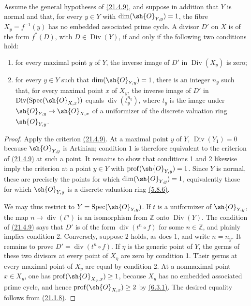 \begin{corollary}[21.4.10]
\ifdefined\EGAIVSuppressErratumLabels\else\label{IV.21.4.10}\fi
Assume the general hypotheses of {\hyperlink{ega4.c04.prop.21-4-9}{(21.4.9)}}, and suppose in addition that
$Y$ is normal and that, for every $y\in Y$ with
$\dim(\sh{O}_{Y,y})=1$, the fibre $X_y=f^{-1}(y)$ has no embedded
associated prime cycle.  A divisor $D'$ on $X$ is of the form $f^*(D)$,
with $D\in\operatorname{Div}(Y)$, if and only if the following two
conditions hold:
\begin{enumerate}[label=\textup{\arabic*\textdegree}]
\item for every maximal point $y$ of $Y$, the inverse image of $D'$ in
$\operatorname{Div}(X_y)$ is zero;
\item for every $y\in Y$ such that $\dim(\sh{O}_{Y,y})=1$, there is an
integer $n_y$ such that, for every maximal point $x$ of $X_y$, the
inverse image of $D'$ in
$\operatorname{Div}(\operatorname{Spec}(\sh{O}_{X,x}))$ equals
$\operatorname{div}(t_y^{n_y})$, where $t_y$ is the image under
$\sh{O}_{Y,y}\to\sh{O}_{X,x}$ of a uniformizer of the discrete
valuation ring $\sh{O}_{Y,y}$.
\end{enumerate}
\end{corollary}

\begin{proof}
Apply the criterion {\hyperlink{ega4.c04.prop.21-4-9}{(21.4.9)}}.  At a maximal point $y$ of $Y$,
$\operatorname{Div}(Y_1)=0$ because $\sh{O}_{Y,y}$ is Artinian;
condition 1\textdegree{} is therefore equivalent to the criterion of
{\hyperlink{ega4.c04.prop.21-4-9}{(21.4.9)}} at such a point.  It remains to show that conditions
1\textdegree{} and 2\textdegree{} likewise imply the criterion at a
point $y\in Y$ with $\operatorname{prof}(\sh{O}_{Y,y})=1$.  Since $Y$
is normal, these are precisely the points for which
$\dim(\sh{O}_{Y,y})=1$, equivalently those for which
$\sh{O}_{Y,y}$ is a discrete valuation ring {\hyperlink{ega4.c04.thm.5-8-6}{(5.8.6)}}.

We may thus restrict to $Y=\operatorname{Spec}(\sh{O}_{Y,y})$.  If $t$
is a uniformizer of $\sh{O}_{Y,y}$, the map
$n\mapsto\operatorname{div}(t^n)$ is an isomorphism from $\mathbb Z$
onto $\operatorname{Div}(Y)$.  The condition of {\hyperlink{ega4.c04.prop.21-4-9}{(21.4.9)}} says that
$D'$ is of the form $\operatorname{div}(t^n\circ f)$ for some
$n\in\mathbb Z$, and plainly implies condition 2\textdegree{}.
Conversely, suppose 2\textdegree{} holds, as does 1\textdegree{}, and
write $n=n_y$.  It remains to prove
$D'=\operatorname{div}(t^n\circ f)$.  If $\eta$ is the generic point of
$Y$, the germs of these two divisors at every point of $X_\eta$ are
zero by condition 1\textdegree{}.  Their germs at every maximal point
of $X_y$ are equal by condition 2\textdegree{}.  At a nonmaximal point
$x\in X_y$, one has
$\operatorname{prof}(\sh{O}_{X_y,x})\geq 1$, because $X_y$ has no
embedded associated prime cycle, and hence
$\operatorname{prof}(\sh{O}_{X,x})\geq 2$ by {\hyperlink{ega4.c04.prop.6-3-1}{(6.3.1)}}.  The desired
equality follows from {\hyperlink{ega4.c04.prop.21-1-8}{(21.1.8)}}.
\end{proof}


